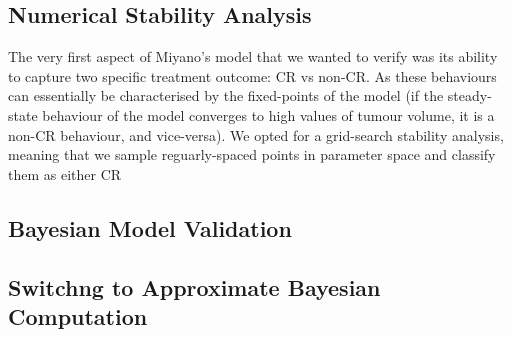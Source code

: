 \documentclass[11pt]{article}
\begin{document}
\subsection{Numerical Stability Analysis}
The very first aspect of Miyano's model that we wanted to verify was its ability to capture two specific treatment outcome: CR vs non-CR. As these behaviours can essentially be characterised by the fixed-points of the model (if the steady-state behaviour of the model converges to high values of tumour volume, it is a non-CR behaviour, and vice-versa). We opted for a grid-search stability analysis, meaning that we sample reguarly-spaced points in parameter space and classify them as either CR 
\subsection{Bayesian Model Validation}

\subsection{Switchng to Approximate Bayesian Computation}

\newpage 
\clearpage
\newpage



\end{document}
